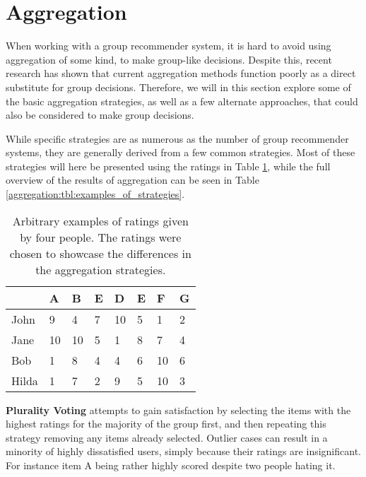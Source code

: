 \section{Aggregation} \label{bg:aggregation}
When working with a group recommender system, it is hard to avoid using aggregation of some kind, to make group-like decisions. Despite this, recent research has shown that current aggregation methods function poorly as a direct substitute for group decisions\cite{aggregationnotenough}. Therefore, we will in this section explore some of the basic aggregation strategies, as well as a few alternate approaches, that could also be considered to make group decisions.

While specific strategies are as numerous as the number of group recommender systems, they are generally derived from a few common strategies\cite{recsyshandbookagreggation}. Most of these strategies will here be presented using the ratings in Table \ref{aggregation:tbl:table_of_ratings}, while the full overview of the results of aggregation can be seen in Table \ref{aggregation:tbl:examples_of_strategies}.

\begin{table}[H]
	\centering
	\begin{tabular}{ | p{2cm} | p{1cm} | p{1cm} | p{1cm} | p{1cm} | p{1cm} | p{1cm} | p{1cm} | } \hline
		 & \textbf{A} & \textbf{B} & \textbf{E} & \textbf{D} & \textbf{E} & \textbf{F} & \textbf{G}  \\ \hline
		John & 9 & 4 & 7 & 10 & 5 & 1 & 2 \\ \hline
		Jane & 10 & 10 & 5 & 1 & 8 & 7 & 4 \\ \hline
		Bob & 1 & 8 & 4 & 4 & 6 & 10 & 6 \\ \hline
		Hilda & 1 & 7 & 2 & 9 & 5 & 10 & 3 \\ \hline
	\end{tabular}
	\caption{Arbitrary examples of ratings given by four people. The ratings were chosen to showcase the differences in the aggregation strategies.}
	\label{aggregation:tbl:table_of_ratings}
\end{table}

\textbf{Plurality Voting} attempts to gain satisfaction by selecting the items with the highest ratings for the majority of the group first, and then repeating this strategy removing any items already selected. Outlier cases can result in a minority of highly dissatisfied users, simply because their ratings are insignificant. For instance item A being rather highly scored despite two people hating it.\\

